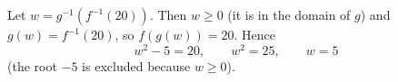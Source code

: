 Let $w=g^{-1}\left(f^{-1}(20)\right)$. Then $w\ge0$ (it is in the domain of $g$) and $g(w)=f^{-1}(20)$, so $f(g(w))=20$. Hence
\[w^2-5=20,\qquad w^2=25,\qquad w=\boxed{5}\]
(the root $-5$ is excluded because $w\ge0$).
